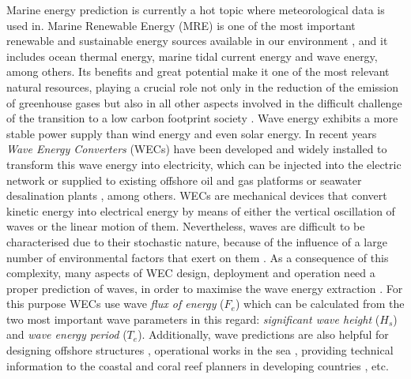 \documentclass[energies,article,submit,moreauthors,pdftex]{Definitions/mdpi}
\begin{document}
		Marine energy prediction is currently a hot topic where meteorological data is used in. Marine Renewable Energy (MRE) is one of the most important renewable and sustainable energy sources available in our environment \textcolor{red}{\cite{en12050787}}, and it includes ocean thermal energy, marine tidal current energy and wave energy, among others. Its benefits and great potential \cite{ZEYRINGER20181281} make it one of the most relevant natural resources, playing a crucial role not only in the reduction of the emission of greenhouse gases but also in all other aspects involved in the difficult challenge of the transition to a low carbon footprint society \textcolor{red}{\cite{en12091657, BREDE201344}}. Wave energy exhibits a more stable power supply than wind energy and even solar energy. In recent years \textit{Wave Energy Converters} (WECs) \cite{FALCAO2010899} have been developed and widely installed to transform this wave energy into electricity, which can be injected into the electric network or supplied to existing offshore oil and gas platforms \cite{OLIVEIRAPINTO2019556} or seawater desalination plants \cite{FERNANDEZPRIETO2019546}, among others. WECs are mechanical devices that convert kinetic energy into electrical energy by means of either the vertical oscillation of waves or the linear motion of them. Nevertheless, waves are difficult to be characterised due to their stochastic nature, because of the influence of a large number of environmental factors that exert on them \cite{ochi1998}. As a consequence of this complexity, many aspects of WEC design, deployment and operation \cite{CROWLEY2018159, Abdelkhalik2016, 6898109} need a proper prediction of waves, in order to maximise the wave energy extraction \textcolor{red}{\cite{en80910370}}. For this purpose WECs use wave \textit{flux of energy} ($F_e$) which can be calculated from the two most important wave parameters in this regard: \textit{significant wave height} ($H_s$) and \textit{wave energy period} ($T_e$). Additionally, wave predictions \textcolor{red}{\cite{en11010011}} are also helpful for designing offshore structures \cite{CHATZIIOANNOU2017126}, operational works in the sea \cite{DALGIC2015211}, providing technical information to the coastal and coral reef planners in developing countries \cite{CALLAGHAN2018123}, etc.
\end{document}
